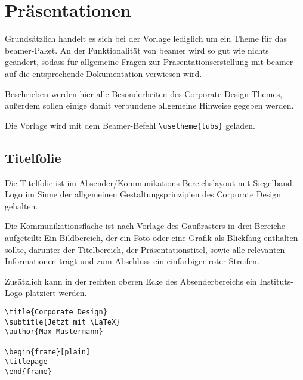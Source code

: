 \chapter{Präsentationen}


Grundsätzlich handelt es sich bei der Vorlage lediglich um ein Theme für
das beamer-Paket. An der Funktionalität von beamer wird so gut wie nichts
geändert, sodass für allgemeine Fragen zur Präsentationserstellung mit beamer
auf die entsprechende Dokumentation verwiesen wird. %

Beschrieben werden hier alle Besonderheiten des Corporate-Design-Themes, außerdem sollen
einige damit verbundene allgemeine Hinweise gegeben werden.

Die Vorlage wird mit dem Beamer-Befehl \lstinline!\usetheme{tubs}! geladen.

\section{Titelfolie}

Die Titelfolie ist im Absender/Kommunikations-Bereichslayout mit
Siegelband-Logo im Sinne der allgemeinen Gestaltungsprinzipien des
Corporate Design gehalten.

Die Kommunikationsfläche ist nach Vorlage des Gaußrasters %
in drei Bereiche aufgeteilt:
Ein Bildbereich, der ein Foto oder eine Grafik als Blickfang enthalten
sollte,
darunter der Titelbereich, der Präsentationstitel, sowie alle relevanten
Informationen trägt
und zum Abschluss ein einfarbiger roter Streifen.

Zusätzlich kann in der rechten oberen Ecke des Absenderbereichs ein
Instituts-Logo platziert werden.

\begin{minipage}{0.5\textwidth}
\begin{verbatim}
\title{Corporate Design}
\subtitle{Jetzt mit \LaTeX}
\author{Max Mustermann}

\begin{frame}[plain]
\titlepage
\end{frame}
\end{verbatim}
\end{minipage}
\begin{minipage}{0.5\textwidth}
\end{minipage}

